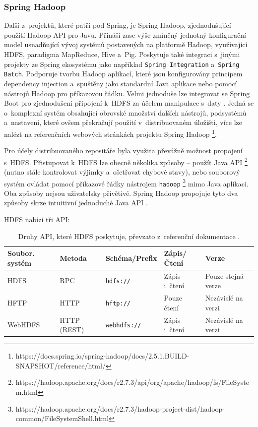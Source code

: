 \subsubsection{Spring Hadoop}
Další z~projektů, které patří pod Spring, je Spring Hadoop, zjednodušující použití Hadoop API pro Javu. Přináší zase výše zmíněný jednotný konfigurační model usnadňující vývoj systémů postavených na platformě Hadoop, využívající HDFS, paradigma MapReduce, Hive a~Pig. Poskytuje také integraci s~jinými projekty ze Spring ekosystému jako například \texttt{Spring Integration} a~\texttt{Spring Batch}. Podporuje tvorbu Hadoop aplikací, které jsou konfigurovány principem dependency injection a~spuštěny jako standardní Java aplikace nebo pomocí nástrojů Hadoop pro příkazovou řádku.
Velmi jednoduše lze integrovat se Spring Boot pro zjednodušení připojení k~HDFS za účelem manipulace s~daty \cite{springHadoop}. Jedná se o~komplexní systém obsahující obrovské množství dalších nástrojů, podsystémů a~nastavení, které ovšem překračují použití v~distribuovaném úložišti, více lze nalézt na referenčních webových stránkách projektu Spring Hadoop \footnote{https://docs.spring.io/spring-hadoop/docs/2.5.1.BUILD-SNAPSHOT/reference/html/}.

Pro účely distribuovaného repositáře byla využita převážně možnost propojení s~HDFS. Přistupovat k~HDFS lze obecně několika způsoby -- použít Java API \footnote{https://hadoop.apache.org/docs/r2.7.3/api/org/apache/hadoop/fs/FileSystem.html} (nutno stále kontrolovat výjimky a~ošetřovat chybové stavy), nebo souborový systém ovládat pomocí příkazové řádky nástrojem \texttt{hadoop} \footnote{https://hadoop.apache.org/docs/r2.7.3/hadoop-project-dist/hadoop-common/FileSystemShell.html} mimo Java aplikaci. Oba způsoby nejsou uživatelsky přívětivé. Spring Hadoop propojuje tyto dva způsoby skrze intuitivní jednoduché Java API \cite{springHadoopReference}.

HDFS nabízí tři API:
\begin{table}[h!]
    \centering
    \begin{tabular}{| l | l | l | l | l |}
    \hline
    Soubor. systém   &   Metoda   &   Schéma/Prefix &  Zápis/Čtení &   Verze \\ \hline
    HDFS & RPC & \texttt{hdfs://} & Zápis i~čtení & Pouze stejná verze \\ \hline
    HFTP & HTTP & \texttt{hftp://} & Pouze čtení & Nezávislé na verzi \\ \hline
    WebHDFS & HTTP (REST) & \texttt{webhdfs://} & Zápis i~čtení & Nezávislé na verzi \\ \hline
    \end{tabular}\par
    \bigskip
    \caption{Druhy API, které HDFS poskytuje, převzato z~referenční dokumentace \cite{springHadoopReference}.}
    \label{HDFSApi}
\end{table}

